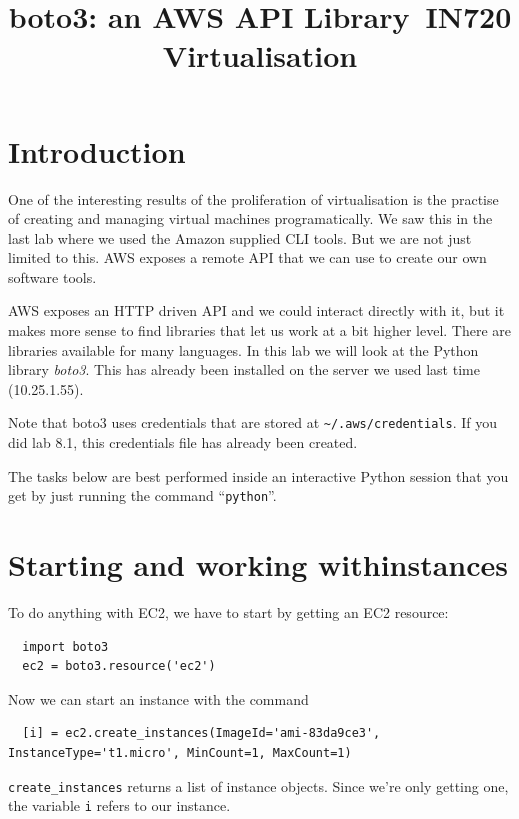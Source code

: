 \documentclass{article}
\begin{document}
\title{boto3: an AWS API Library\ IN720 Virtualisation}
\date{}
\maketitle

\section*{Introduction}
One of the interesting results of the proliferation of virtualisation is the practise of creating and managing virtual machines programatically. We saw this in the last lab where we used the Amazon supplied CLI tools. But we are not just limited to this. AWS exposes a remote API that we can use to create our own software tools.

AWS exposes an HTTP driven API and we could interact directly with it, but it makes more sense to find libraries that let us work at a bit higher level. There are libraries available for many languages.  In this lab we will look at the Python library \emph{boto3}. This has already been installed on the server we used last time (10.25.1.55).

Note that boto3 uses credentials that are stored at \texttt{\textasciitilde/.aws/credentials}. If you did lab 8.1, this credentials file has already been created.

The tasks below are best performed inside an interactive Python session that you get by just running the command ``\texttt{python}''.

\section{Starting and working withinstances}

To do anything with EC2, we have to start by getting an EC2 resource:

\begin{verbatim}
  import boto3
  ec2 = boto3.resource('ec2')
\end{verbatim}

Now we can start an instance with the command

\begin{verbatim}
  [i] = ec2.create_instances(ImageId='ami-83da9ce3', InstanceType='t1.micro', MinCount=1, MaxCount=1)
\end{verbatim}
  
\texttt{create\_instances} returns a list of instance objects.  Since we're only getting one, the variable \texttt{i} refers to our instance.
\end{document}
